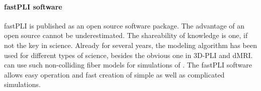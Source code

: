 \paragraph{\acs{fastPLI} software}%
\ac{fastPLI} is published as an open source software package.
The advantage of an open source cannot be underestimated.
The shareability of knowledge is one, if not the key in science.
Already for several years, the modeling algorithm has been used for different types of science, besides the obvious one in \ac{3D-PLI} and \ac{dMRI}.
\cite{Ji2021} can use such non-colliding fiber models for simulations of \dummy{}.
The \ac{fastPLI} software allows easy operation and fast creation of simple as well as complicated simulations.